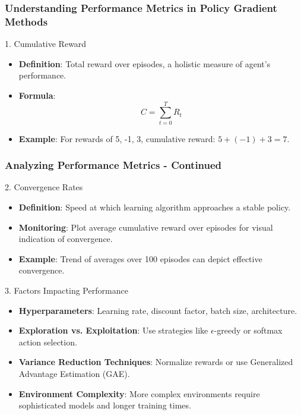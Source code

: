 \documentclass{beamer}
\begin{document}
\begin{frame}
    \frametitle{Understanding Performance Metrics in Policy Gradient Methods}

    \begin{block}{1. Cumulative Reward}
        \begin{itemize}
            \item \textbf{Definition}: Total reward over episodes, a holistic measure of agent's performance.
            \item \textbf{Formula}: 
            \[
            C = \sum_{t=0}^{T} R_t
            \]
            \item \textbf{Example}: For rewards of 5, -1, 3, cumulative reward: \(5 + (-1) + 3 = 7\).
        \end{itemize}
    \end{block}
\end{frame}

\begin{frame}
    \frametitle{Analyzing Performance Metrics - Continued}

    \begin{block}{2. Convergence Rates}
        \begin{itemize}
            \item \textbf{Definition}: Speed at which learning algorithm approaches a stable policy.
            \item \textbf{Monitoring}: Plot average cumulative reward over episodes for visual indication of convergence.
            \item \textbf{Example}: Trend of averages over 100 episodes can depict effective convergence.
        \end{itemize}
    \end{block}

    \begin{block}{3. Factors Impacting Performance}
        \begin{itemize}
            \item \textbf{Hyperparameters}: Learning rate, discount factor, batch size, architecture.
            \item \textbf{Exploration vs. Exploitation}: Use strategies like $\epsilon$-greedy or softmax action selection.
            \item \textbf{Variance Reduction Techniques}: Normalize rewards or use Generalized Advantage Estimation (GAE).
            \item \textbf{Environment Complexity}: More complex environments require sophisticated models and longer training times.
        \end{itemize}
    \end{block}
\end{frame}
\end{document}
